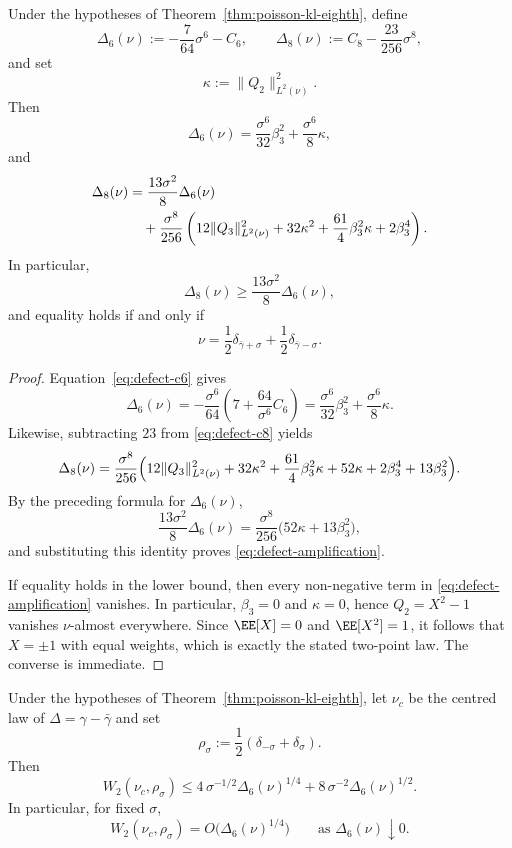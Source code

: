 \begin{theorem}\label{thm:poisson-defect-amplification}
Under the hypotheses of Theorem~\ref{thm:poisson-kl-eighth}, define
\[
\Delta_6(\nu):=-\frac{7}{64}\sigma^6-C_6,
\qquad
\Delta_8(\nu):=C_8-\frac{23}{256}\sigma^8,
\]
and set
\[
\kappa:=\|Q_2\|_{L^2(\nu)}^2.
\]
Then
\[
\Delta_6(\nu)
=\frac{\sigma^6}{32}\beta_3^2+\frac{\sigma^6}{8}\kappa,
\]
and
\begin{align}
\Delta_8(\nu)
&=
\frac{13\sigma^2}{8}\Delta_6(\nu)
\notag\\
&\quad
+\frac{\sigma^8}{256}\left(
12\|Q_3\|_{L^2(\nu)}^2
+32\kappa^2
+\frac{61}{4}\beta_3^2\kappa
+2\beta_3^4
\right). \label{eq:defect-amplification}
\end{align}
In particular,
\[
\Delta_8(\nu)\ge \frac{13\sigma^2}{8}\Delta_6(\nu),
\]
and equality holds if and only if
\[
\nu=\frac12\delta_{\bar\gamma+\sigma}
+\frac12\delta_{\bar\gamma-\sigma}.
\]
\end{theorem}

\begin{proof}
Equation~\eqref{eq:defect-c6} gives
\[
\Delta_6(\nu)
=-\frac{\sigma^6}{64}\left(7+\frac{64}{\sigma^6}C_6\right)
=\frac{\sigma^6}{32}\beta_3^2+\frac{\sigma^6}{8}\kappa.
\]
Likewise, subtracting $23$ from \eqref{eq:defect-c8} yields
\[
\Delta_8(\nu)
=\frac{\sigma^8}{256}\Bigl(
12\|Q_3\|_{L^2(\nu)}^2
+32\kappa^2
+\frac{61}{4}\beta_3^2\kappa
+52\kappa
+2\beta_3^4
+13\beta_3^2
\Bigr).
\]
By the preceding formula for $\Delta_6(\nu)$,
\[
\frac{13\sigma^2}{8}\Delta_6(\nu)
=\frac{\sigma^8}{256}\bigl(52\kappa+13\beta_3^2\bigr),
\]
and substituting this identity proves \eqref{eq:defect-amplification}.

If equality holds in the lower bound, then every non-negative term in
\eqref{eq:defect-amplification} vanishes.  In particular,
$\beta_3=0$ and $\kappa=0$, hence $Q_2=X^2-1$ vanishes
$\nu$-almost everywhere.  Since $\EE[X]=0$ and $\EE[X^2]=1$, it follows
that $X=\pm 1$ with equal weights, which is exactly the stated
two-point law.  The converse is immediate.
\end{proof}

\begin{theorem}%
\label{thm:poisson-defect-stability}
Under the hypotheses of Theorem~\ref{thm:poisson-kl-eighth}, let
$\nu_c$ be the centred law of $\Delta=\gamma-\bar\gamma$ and set
\[
\rho_\sigma:=\frac12(\delta_{-\sigma}+\delta_\sigma).
\]
Then
\[
W_2(\nu_c,\rho_\sigma)
\le
4\,\sigma^{-1/2}\Delta_6(\nu)^{1/4}
+8\,\sigma^{-2}\Delta_6(\nu)^{1/2}.
\]
In particular, for fixed $\sigma$,
\[
W_2(\nu_c,\rho_\sigma)=O\!\bigl(\Delta_6(\nu)^{1/4}\bigr)
\qquad\text{as }\Delta_6(\nu)\downarrow 0.
\]
\end{theorem}

